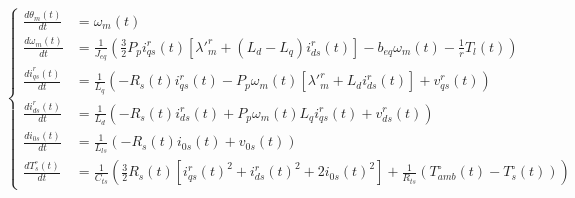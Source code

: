 \documentclass[a4paper, 10pt, onecolumn,journal]{ieeeconf}
\begin{document}
\begin{equation}
    \begin{cases} 
        \frac{d \theta_m(t)}{dt}  &= \omega_m(t)\\ 
        \frac{d \omega_m(t)}{dt}  &= \frac{1}{J_{eq}}\left(\frac{3}{2} P_p i^r_{qs}(t)\left[\lambda'^r_m + (L_d - L_q) i^r_{ds}(t) \right] - b_{eq}\omega_m(t) - \frac{1}{r}T_l(t)\right)\\ 
        \frac{d i^r_{qs}(t)}{dt}  &= \frac{1}{L_{q}}\left(-R_s(t) i^r_{qs}(t)- P_p \omega_m(t) \left[\lambda'^r_m + L_d i^r_{ds}(t)\right] + v^r_{qs}(t)\right)\\ 
        \frac{d i^r_{ds}(t)}{dt}  &= \frac{1}{L_{d}}\left(-R_s(t) i^r_{ds}(t) + P_p \omega_m(t) L_q i^r_{qs}(t)  + v^r_{ds}(t)\right)\\ 
        \frac{d i_{0s}(t)}{dt}    &= \frac{1}{L_{ls}}\left(-R_s(t) i_{0s}(t) + v_{0s}(t)\right) \\ 
        \frac{d T^\circ_s(t)}{dt} &= \frac{1}{C_{ts}}\left(\frac{3}{2} R_s(t) \left[ {i^r_{qs}(t)}^2 + {i^r_{ds}(t)}^2 + 2 {i_{0s}(t)}^2 \right] + \frac{1}{R_{ts}}\left(T^{\circ}_{amb}(t) - T_s^{\circ}(t)\right)\right)
    \end{cases}
    \label{ecuacion vectorial de estado del sistema no matricial}
\end{equation}
\end{document}
